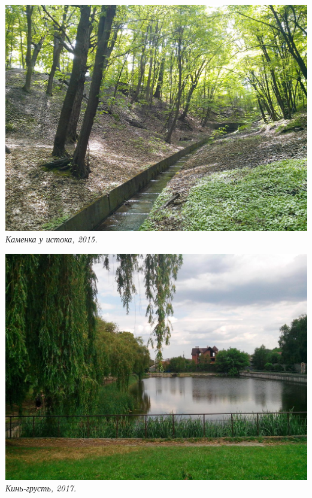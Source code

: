 \begin{center}
\includegraphics[width=\linewidth]{rpix/IMG_20150504_142738.jpg}
\textit{Каменка у истока, 2015.}
\end{center}

\vspace*{\fill}



\begin{center}
\includegraphics[width=\linewidth]{rpix/IMG_20170611_150523.jpg}
\textit{Кинь-грусть, 2017.}
\end{center}


